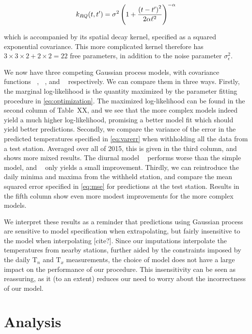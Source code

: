 \documentclass[letter]{article}
\newcommand{\genericdel}[3]{%
      \left#1#3\right#2
    }
\newcommand{\del}[1]{\genericdel(){#1}}
\newcommand{\T}{\mathrm{T}}
\newcommand{\Tn}{\T_{n}}
\newcommand{\Tx}{\T_{x}}
\newcommand{\sigman}{\sigma_{\epsilon}}
\DeclareMathOperator{\kSESE}{k_{\mathtt{SExSE}}}
\DeclareMathOperator{\kdiurn}{k_{\mathtt{SESE_24}}}
\DeclareMathOperator{\ksumprod}{k_{\mathtt{sumprod}}}
\begin{document}
\begin{equation}
    k_{RQ}(t,t') = \sigma^2 \del{1 + \frac{\del{t-t'}^2}{2\alpha\ell^2} }^{-\alpha}
\end{equation}

which is accompanied by its spatial decay kernel, specified as a squared exponential covariance.
This more complicated kernel therefore has \(3 \times 3 \times 2 + 2 \times 2 = 22\) free parameters, in addition to the noise parameter \(\sigman^2\).

We now have three competing Gaussian process models, with covariance functions \(\kSESE\), \(\kdiurn\), and \(\ksumprod\) respectively. We can compare them in three ways. Firstly, the marginal log-likelihood is the quantity maximized by the parameter fitting procedure in \eqref{eq:optimization}. The maximized log-likelihood can be found in the second column of Table~XX, and we see that the more complex models indeed yield a much higher log-likelihood, promising a better model fit which should yield better predictions. Secondly, we compare the variance of the error in the predicted temperatures specified in \eqref{eq:varerr} when withholding all the data from a test station. Averaged over all of 2015, this is given in the third column, and shows more mixed results. The diurnal model \(\kdiurn\) performs worse than the simple \(\kSESE\) model, and \(\ksumprod\) only yields a small improvement.
Thirdly, we can reintroduce the daily minima and maxima from the withheld station, and compare the mean squared error specified in \eqref{eq:mse} for predictions at the test station. Results in the fifth column show even more modest improvements for the more complex models.

We interpret these results as a reminder that predictions using Gaussian process are sensitive to model specification when extrapolating, but fairly insensitive to the model when interpolating {[}cite?{]}. Since our imputations interpolate the temperatures from nearby stations, further aided by the constraints imposed by the daily \(\Tn\) and \(\Tx\) measurements, the choice of model does not have a large impact on the performance of our procedure. This insensitivity can be seen as reassuring, as it (to an extent) reduces our need to worry about the incorrectness of our model.
    


        \section{Analysis}\label{analysis}
\end{document}
